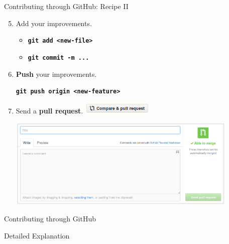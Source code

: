 \documentclass{beamer}
\begin{document}
\begin{frame}{Contributing through GitHub: Recipe II}
  \begin{enumerate}
    \setcounter{enumi}{4}
  \item Add your improvements.
    \begin{itemize}
    \item \texttt{\textbf{git add <new-file>}}
    \item \texttt{\textbf{git commit -m ...}}
    \end{itemize}    
  \item \textbf{Push} your improvements.
    \begin{center}
      \texttt{\textbf{git push origin <new-feature>}}
    \end{center}
  \item Send a \textbf{pull request}.
    \includegraphics[height=0.55cm]{figs/github-compare-and-pull-request}
    \begin{center}
      \hbox{\hspace{-0cm}\includegraphics[width=11cm]{figs/github-pull-request}}
    \end{center}
  \end{enumerate}
\end{frame}

\begin{frame}{Contributing through GitHub}
  \begin{center}
    Detailed Explanation
\end{center}
\end{frame}
\end{document}

